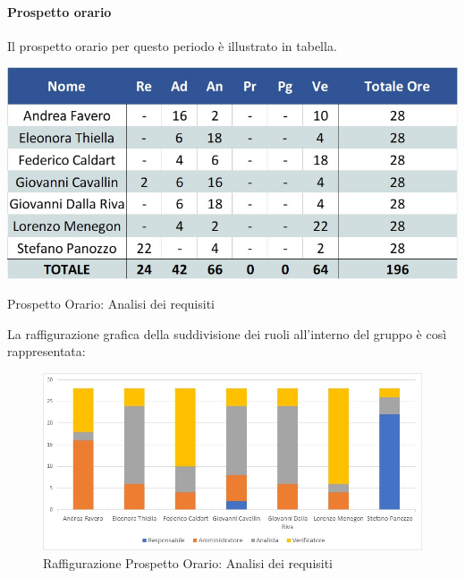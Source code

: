 \paragraph{Prospetto orario}
Il prospetto orario per questo periodo è illustrato in tabella.
\begin{table}[H]
	\centerline{\includegraphics[scale=0.7]{img/Preventivo/AnalisiRequisitiOrario.jpg}}
	\caption{Prospetto Orario: Analisi dei requisiti}
	\clearpage
\end{table}
La raffigurazione grafica della suddivisione dei ruoli all'interno del gruppo è così rappresentata: 
\begin{figure}[H]
	\centerline{\includegraphics[scale=0.85]{img/Preventivo/Istogrammi/AnalisiRequisiti.jpg}}
	\caption{Raffigurazione Prospetto Orario: Analisi dei requisiti}
	\clearpage
\end{figure}
\newpage
